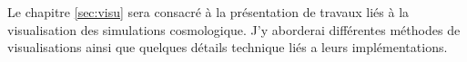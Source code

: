
Le chapitre \ref{sec:visu} sera consacré à la présentation de travaux liés à la visualisation des simulations cosmologique.
J'y aborderai différentes méthodes de visualisations ainsi que quelques détails technique liés a leurs implémentations.



%

%
%

%
%
%
%
